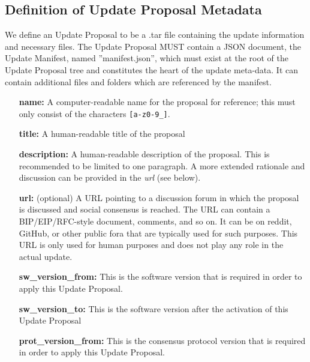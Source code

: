 \subsection{Definition of Update Proposal Metadata}
We define an Update Proposal to be a .tar file containing the update information and necessary files. The Update Proposal MUST contain a JSON document, the Update Manifest, named ''manifest.json'', which must exist at the root of the Update Proposal tree and constitutes the heart of the update meta-data. It can contain additional files and folders which are referenced by the manifest.

\begin{itemize}

\item[\textbf{name:}]A computer-readable name for the proposal for reference; this must only consist of the characters \verb;[a-z0-9_];.

\item[\textbf{title:}] A human-readable title of the proposal

\item[\textbf{description:}] A human-readable description of the proposal. This is recommended to be limited to one paragraph. A more extended rationale and discussion can be provided in the \emph{url} (see below).

\item[\textbf{url:}] (optional) A URL pointing to a discussion forum in which the proposal is discussed and social consensus is reached. The URL can contain a BIP/EIP/RFC-style document, comments, and so on. It can be on reddit, GitHub, or other public fora that are typically used for such purposes. This URL is only used for human purposes and does not play any role in the actual update.

\item[\textbf{sw\_version\_from:}] This is the software version that is required in order to apply this Update Proposal.

\item[\textbf{sw\_version\_to:}] This is the software version after the activation of this Update Proposal

\item[\textbf{prot\_version\_from:}] This is the consensus protocol version that is required in order to apply this Update Proposal.


\end{itemize}
